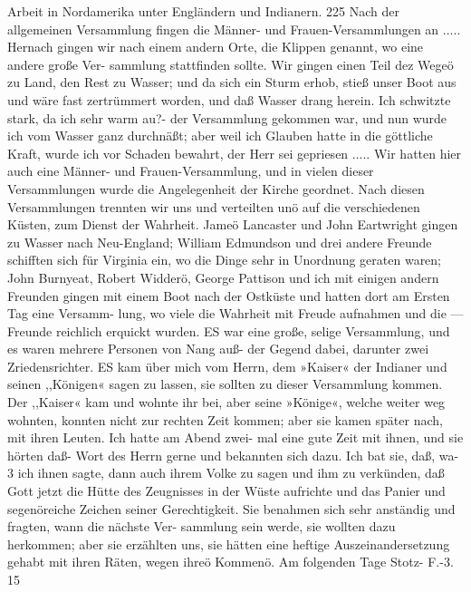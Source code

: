 Arbeit in Nordamerika unter Engländern und Indianern. 225
Nach der allgemeinen Versammlung fingen die Männer- und
Frauen-Versammlungen an ..... Hernach gingen wir nach einem
andern Orte, die Klippen genannt, wo eine andere große Ver-
sammlung stattfinden sollte. Wir gingen einen Teil dez Wegeö
zu Land, den Rest zu Wasser; und da sich ein Sturm erhob, stieß
unser Boot aus und wäre fast zertrümmert worden, und daß
Wasser drang herein. Ich schwitzte stark, da ich sehr warm au?-
der Versammlung gekommen war, und nun wurde ich vom Wasser
ganz durchnäßt; aber weil ich Glauben hatte in die göttliche Kraft,
wurde ich vor Schaden bewahrt, der Herr sei gepriesen .....
Wir hatten hier auch eine Männer- und Frauen-Versammlung,
und in vielen dieser Versammlungen wurde die Angelegenheit der
Kirche geordnet.
Nach diesen Versammlungen trennten wir uns und verteilten
unö auf die verschiedenen Küsten, zum Dienst der Wahrheit.
Jameö Lancaster und John Eartwright gingen zu Wasser nach
Neu-England; William Edmundson und drei andere Freunde
schifften sich für Virginia ein, wo die Dinge sehr in Unordnung
geraten waren; John Burnyeat, Robert Widderö, George Pattison
und ich mit einigen andern Freunden gingen mit einem Boot
nach der Ostküste und hatten dort am Ersten Tag eine Versamm-
lung, wo viele die Wahrheit mit Freude aufnahmen und die —
Freunde reichlich erquickt wurden. ES war eine große, selige
Versammlung, und es waren mehrere Personen von Nang auß-
der Gegend dabei, darunter zwei Zriedensrichter. ES kam über
mich vom Herrn, dem »Kaiser« der Indianer und seinen ,,Königen«
sagen zu lassen, sie sollten zu dieser Versammlung kommen. Der
,,Kaiser« kam und wohnte ihr bei, aber seine »Könige«, welche weiter
weg wohnten, konnten nicht zur rechten Zeit kommen; aber sie
kamen später nach, mit ihren Leuten. Ich hatte am Abend zwei-
mal eine gute Zeit mit ihnen, und sie hörten daß- Wort des Herrn
gerne und bekannten sich dazu. Ich bat sie, daß, wa-3 ich ihnen
sagte, dann auch ihrem Volke zu sagen und ihm zu verkünden,
daß Gott jetzt die Hütte des Zeugnisses in der Wüste aufrichte
und das Panier und segenöreiche Zeichen seiner Gerechtigkeit. Sie
benahmen sich sehr anständig und fragten, wann die nächste Ver-
sammlung sein werde, sie wollten dazu herkommen; aber sie
erzählten uns, sie hätten eine heftige Auszeinandersetzung gehabt
mit ihren Räten, wegen ihreö Kommenö. Am folgenden Tage
Stotz- F.-3. 15


